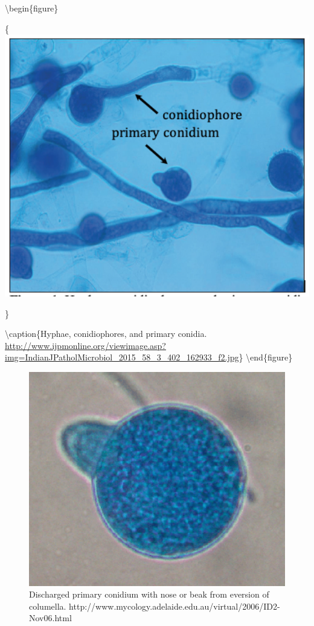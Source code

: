 \documentclass[]{book}
\begin{document}
\textbackslash begin\{figure\}

\{\centering \includegraphics[width=5.28in]{img/Ch5_Fig1}

\}

\textbackslash caption\{Hyphae, conidiophores, and primary conidia. \url{http://www.ijpmonline.org/viewimage.asp?img=IndianJPatholMicrobiol_2015_58_3_402_162933_f2.jpg}\}\label{fig:ch5fig1}
\textbackslash end\{figure\}

\begin{figure}

{\centering \includegraphics[width=4.75in]{img/Ch5_Fig2} 

}

\caption{Discharged primary conidium with nose or beak from eversion of columella. http://www.mycology.adelaide.edu.au/virtual/2006/ID2-Nov06.html}\label{fig:ch5fig2}
\end{figure}
\end{document}

